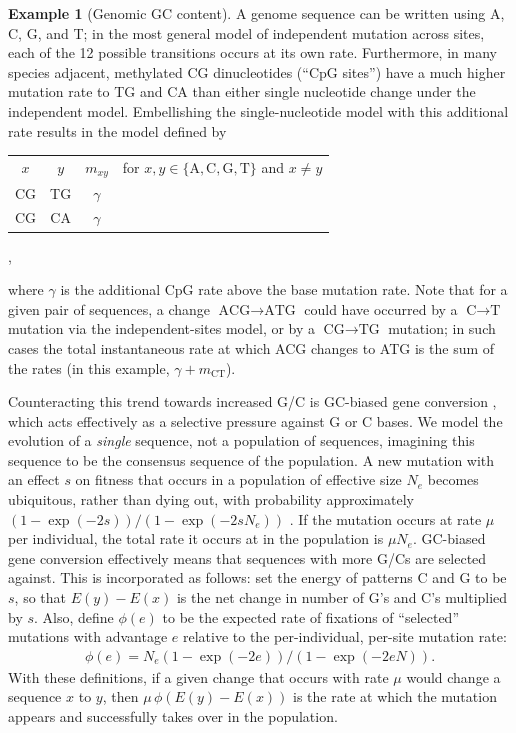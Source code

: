 \documentclass{article}
\newcommand{\nA}{\mbox{A}}  %
\newcommand{\nC}{\mbox{C}}
\newcommand{\nG}{\mbox{G}}
\newcommand{\nT}{\mbox{T}}
\theoremstyle{plain}
\theoremstyle{definition}
\newtheorem{example}{Example}[section]
\begin{document}
\begin{example}[Genomic GC content]
    A genome sequence can be written using A, C, G, and T;
    in the most general model of independent mutation across sites, each of the 12 possible transitions occurs at its own rate.
    Furthermore, in many species
    adjacent, methylated CG dinucleotides (``CpG sites'') have a much higher mutation rate to TG and CA
    than either single nucleotide change under the independent model.
    Embellishing the single-nucleotide model with this additional rate results in the model defined by
    \begin{center}
      \begin{tabular}{c@{\quad$\to$\quad}c@{\quad at rate\quad }cc}
        $x$  &  $y$  &  $m_{xy}$ & for $x, y \in \{\nA,\nC,\nG,\nT\}$ and $x \neq y$ \\
        \nC\nG   &  \nT\nG   &  $\gamma$ & \\
        \nC\nG   &  \nC\nA   &  $\gamma$ &
      \end{tabular},
    \end{center}
    where $\gamma$ is the additional CpG rate above the base mutation rate.
    Note that for a given pair of sequences,
    a change $\nA\nC\nG \to \nA\nT\nG$ could have occurred by a $\nC \to \nT$ mutation
    via the independent-sites model,
    or by a $\nC\nG \to \nT\nG$ mutation;
    in such cases
    the total instantaneous rate at which ACG changes to ATG is the sum of the rates
    (in this example, $\gamma + m_{\nC\nT}$).

    Counteracting this trend towards increased G/C is GC-biased gene conversion \citep{glemin2015quantification},
    which acts effectively as a selective pressure against G or C bases.
    We model the evolution of a \emph{single} sequence, not a population of sequences,
    imagining this sequence to be the consensus sequence of the population.
    A new mutation with an effect $s$ on fitness that occurs
    in a population of effective size $N_e$ becomes ubiquitous, rather than dying out,
    with probability approximately $(1-\exp(-2 s))/(1-\exp(-2 s N_e))$ \citep{kimura1962probability}.
    If the mutation occurs at rate $\mu$ per individual,
    the total rate it occurs at in the population is $\mu N_e$.
    GC-biased gene conversion effectively means that sequences with more G/Cs are selected against.
    This is incorporated as follows: set the energy of patterns \nC{} and \nG{} to be $s$,
    so that $E(y)-E(x)$ is the net change in number of G's and C's multiplied by $s$.
    Also, define $\phi(e)$ to be the expected rate of fixations of ``selected'' mutations
    with advantage $e$ relative to the per-individual, per-site mutation rate:
    \begin{align*}
        \phi(e) = N_e (1-\exp(-2e))/(1-\exp(-2eN)).
    \end{align*}
    With these definitions,
    if a given change that occurs with rate $\mu$ would change a sequence $x$ to $y$,
    then $\mu \, \phi(E(y)-E(x))$ is the rate at which the mutation
    appears and successfully takes over in the population.


\end{example}
\end{document}

